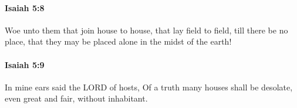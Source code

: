 		\paragraph{Isaiah 5:8} %
			\label{ISAIAH-5-8}

			Woe unto them that join house to house, that lay field to field, till there be no place, that they may be placed alone in the midst of the earth!


		\paragraph{Isaiah 5:9} %
			\label{ISAIAH-5-9}

			In mine ears said the LORD of hosts, Of a truth many houses shall be desolate, even great and fair, without inhabitant.


